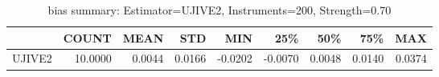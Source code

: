\begin{table}[ht]
\centering
\caption{bias summary: Estimator=UJIVE2, Instruments=200, Strength=0.70}
\begin{tabular}{lrrrrrrrr}
\toprule
 & COUNT & MEAN & STD & MIN & 25\% & 50\% & 75\% & MAX \\
\midrule
UJIVE2 & 10.0000 & 0.0044 & 0.0166 & -0.0202 & -0.0070 & 0.0048 & 0.0140 & 0.0374 \\
\bottomrule
\end{tabular}
\end{table}
